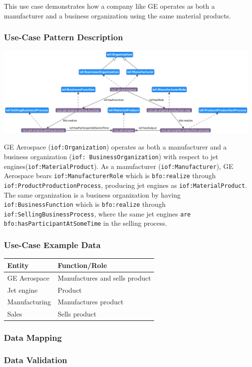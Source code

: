 This use case demonstrates how a company like GE operates as both a manufacturer and a business organization using the same material products.

\subsubsection*{Use-Case Pattern Description}
\includegraphics[scale=0.4]{scenarios/different-type-organizations/image/different-type-organizations}

GE Aerospace (\texttt{iof:Organization}) operates as both a manufacturer and a business organization (\texttt{iof: BusinessOrganization}) with respect to jet engines(\texttt{iof:MaterialProduct}). As a manufacturer (\texttt{iof:Manufacturer}), GE Aerospace bears \texttt{iof:ManufacturerRole} which is \texttt{bfo:realize} through \texttt{iof:ProductProductionProcess}, producing jet engines as \texttt{iof:MaterialProduct}. The same organization is a business organization by having \texttt{iof:BusinessFunction} which is \texttt{bfo:realize} through \texttt{iof:SellingBusinessProcess}, where the same jet engines \texttt{are bfo:hasParticipantAtSomeTime} in the selling process.

\subsubsection*{Use-Case Example Data}


\begin{table}[h]
\label{tab:organization-structure}
\begin{tabular}{|l|l|}
\hline
Entity & Function/Role \\ \hline
GE Aerospace & Manufactures and sells product \\
Jet engine & Product \\
Manufacturing & Manufactures product \\
Sales & Sells product \\
\hline
\end{tabular}%
\end{table}


\subsubsection*{Data Mapping}


\subsubsection*{Data Validation}
